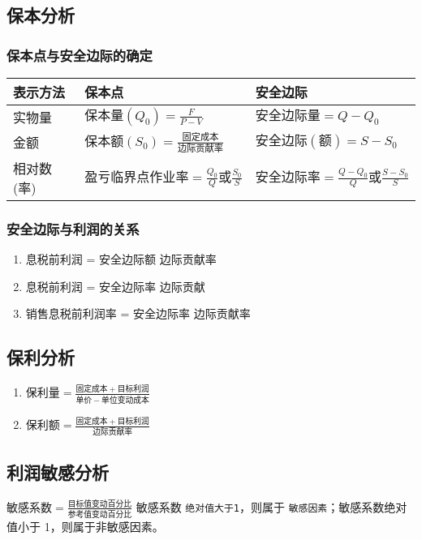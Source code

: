 \documentclass[11pt]{article}
\begin{document}
\subsection{保本分析}
\label{sec:orgd2c8c66}
\subsubsection{保本点与安全边际的确定}
\label{sec:orgc584f3c}
\begin{center}
\begin{tabular}{lll}
表示方法 & 保本点 & 安全边际\\
\hline
实物量 & \(保本量(Q_{0})=\frac{F}{P-V}\) & \(安全边际量=Q-Q_{0}\)\\
金额 & \(保本额(S_{0})=\frac{固定成本}{边际贡献率}\) & \(安全边际(额)=S-S_{0}\)\\
相对数(率) & \(盈亏临界点作业率=\frac{Q_{0}}{Q}或\frac{S_{0}}{S}\) & \(安全边际率=\frac{Q-Q_{0}}{Q}或\frac{S-S_{0}}{S}\)\\
\end{tabular}
\end{center}
\subsubsection{安全边际与利润的关系}
\label{sec:orge21d69b}
\begin{enumerate}
\item 息税前利润 = 安全边际额 \texttimes{} 边际贡献率
\item 息税前利润 = 安全边际率 \texttimes{} 边际贡献
\item 销售息税前利润率 = 安全边际率 \texttimes{} 边际贡献率
\end{enumerate}
\subsection{保利分析}
\label{sec:org5e60f79}
\begin{enumerate}
\item \(保利量 = \frac{固定成本 + 目标利润}{单价-单位变动成本}\)
\item \(保利额 = \frac{固定成本 + 目标利润}{边际贡献率}\)
\end{enumerate}
\subsection{利润敏感分析}
\label{sec:org3e20a05}
\(敏感系数 = \frac{目标值变动百分比}{参考值变动百分比}\)
敏感系数 \texttt{绝对值大于1}，则属于 \texttt{敏感因素}；敏感系数绝对值小于 1，则属于非敏感因素。
\end{document}
